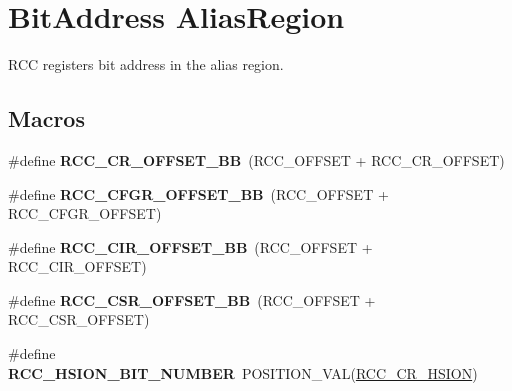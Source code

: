 \hypertarget{group___r_c_c___bit_address___alias_region}{\section{Bit\-Address Alias\-Region}
\label{group___r_c_c___bit_address___alias_region}
}


R\-C\-C registers bit address in the alias region.  


\subsection*{Macros}
\begin{DoxyCompactItemize}
\item 
\hypertarget{group___r_c_c___bit_address___alias_region_gacda2a01fba2f4f6b28d6533aef2f2396}{\#define {\bfseries R\-C\-C\-\_\-\-C\-R\-\_\-\-O\-F\-F\-S\-E\-T\-\_\-\-B\-B}~(R\-C\-C\-\_\-\-O\-F\-F\-S\-E\-T + R\-C\-C\-\_\-\-C\-R\-\_\-\-O\-F\-F\-S\-E\-T)}\label{group___r_c_c___bit_address___alias_region_gacda2a01fba2f4f6b28d6533aef2f2396}

\item 
\hypertarget{group___r_c_c___bit_address___alias_region_gaff4bdac027bca99768bdbdd4bd794abc}{\#define {\bfseries R\-C\-C\-\_\-\-C\-F\-G\-R\-\_\-\-O\-F\-F\-S\-E\-T\-\_\-\-B\-B}~(R\-C\-C\-\_\-\-O\-F\-F\-S\-E\-T + R\-C\-C\-\_\-\-C\-F\-G\-R\-\_\-\-O\-F\-F\-S\-E\-T)}\label{group___r_c_c___bit_address___alias_region_gaff4bdac027bca99768bdbdd4bd794abc}

\item 
\hypertarget{group___r_c_c___bit_address___alias_region_gae509d1d4d3915d2d95b0c141e09a8fd2}{\#define {\bfseries R\-C\-C\-\_\-\-C\-I\-R\-\_\-\-O\-F\-F\-S\-E\-T\-\_\-\-B\-B}~(R\-C\-C\-\_\-\-O\-F\-F\-S\-E\-T + R\-C\-C\-\_\-\-C\-I\-R\-\_\-\-O\-F\-F\-S\-E\-T)}\label{group___r_c_c___bit_address___alias_region_gae509d1d4d3915d2d95b0c141e09a8fd2}

\item 
\hypertarget{group___r_c_c___bit_address___alias_region_gad07932326df75b09ed7c43233a7c6666}{\#define {\bfseries R\-C\-C\-\_\-\-C\-S\-R\-\_\-\-O\-F\-F\-S\-E\-T\-\_\-\-B\-B}~(R\-C\-C\-\_\-\-O\-F\-F\-S\-E\-T + R\-C\-C\-\_\-\-C\-S\-R\-\_\-\-O\-F\-F\-S\-E\-T)}\label{group___r_c_c___bit_address___alias_region_gad07932326df75b09ed7c43233a7c6666}

\item 
\hypertarget{group___r_c_c___bit_address___alias_region_ga9bf60daa74224ea82d3df7e08d4533f1}{\#define {\bfseries R\-C\-C\-\_\-\-H\-S\-I\-O\-N\-\_\-\-B\-I\-T\-\_\-\-N\-U\-M\-B\-E\-R}~P\-O\-S\-I\-T\-I\-O\-N\-\_\-\-V\-A\-L(\hyperlink{group___peripheral___registers___bits___definition_gaf4fcacf94a97f7d49a70e089b39cf474}{R\-C\-C\-\_\-\-C\-R\-\_\-\-H\-S\-I\-O\-N})}\label{group___r_c_c___bit_address___alias_region_ga9bf60daa74224ea82d3df7e08d4533f1}


\end{DoxyCompactItemize}
